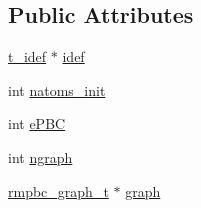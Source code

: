 \subsection*{\-Public \-Attributes}
\begin{DoxyCompactItemize}
\item 
\hyperlink{structt__idef}{t\-\_\-idef} $\ast$ \hyperlink{structgmx__rmpbc_a60f556a5f6ec031da76984c92bb0bfa7}{idef}
\item 
int \hyperlink{structgmx__rmpbc_ae40ad6b0786da5a6383e656b96ef74eb}{natoms\-\_\-init}
\item 
int \hyperlink{structgmx__rmpbc_accd51a022d35b1cb437cab4151904be4}{e\-P\-B\-C}
\item 
int \hyperlink{structgmx__rmpbc_a911597a497f708bda1dfb2aa6b3ce781}{ngraph}
\item 
\hyperlink{structrmpbc__graph__t}{rmpbc\-\_\-graph\-\_\-t} $\ast$ \hyperlink{structgmx__rmpbc_a44e3b69ff94d57f4bea02fe94e0b1a49}{graph}
\end{DoxyCompactItemize}



